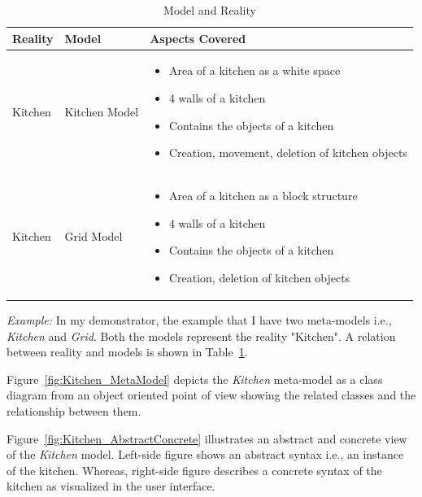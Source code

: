\begin{table}
	\centering	
	\begin{tabular}{|p{3cm}|p{3cm}|p{9cm}|}
		\hline
		\rowcolor[gray]{.8}	
		\textbf{Reality} & \textbf{Model} & \textbf{Aspects Covered} \\
		\hline
		Kitchen & Kitchen Model & 
		\begin{itemize}
			\item Area of a kitchen as a white space
			\item 4 walls of a kitchen
			\item Contains the objects of a kitchen
			\item Creation, movement, deletion of kitchen objects
		\end{itemize}\\
		\hline
		Kitchen & Grid Model & 
		\begin{itemize}
			\item Area of a kitchen as a block structure
			\item 4 walls of a kitchen
			\item Contains the objects of a kitchen
			\item Creation, deletion of kitchen objects
		\end{itemize}\\
		\hline					
		
	\end{tabular}
	\caption{Model and Reality}
	\label{tab:Model_Reality}
\end{table}

\textit{Example:} In my demonstrator, the example that I have two meta-models i.e., \textit{Kitchen} and \textit{Grid}. Both the models represent the reality "Kitchen". A relation between reality and models is shown in Table~\ref{tab:Model_Reality}. 

Figure~\ref{fig:Kitchen_MetaModel} depicts the \textit{Kitchen} meta-model as a class diagram from an object oriented point of view showing the related classes and the relationship between them.

Figure~\ref{fig:Kitchen_AbstractConcrete} illustrates an abstract and concrete view of the \textit{Kitchen} model. Left-side figure shows an abstract syntax i.e., an instance of the kitchen. Whereas, right-side figure describes a concrete syntax of the kitchen as visualized in the user interface.\\

